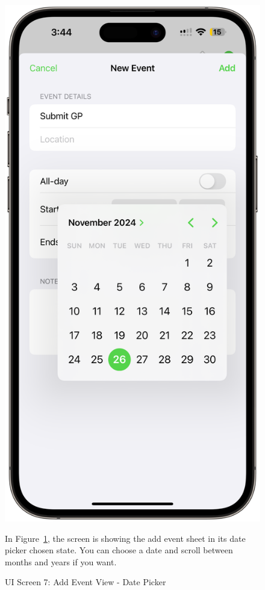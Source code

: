 \begin{figure}[!h]
    \begin{minipage}{0.3\textwidth}
        \centering
        \includegraphics[width=\textwidth]{images/screen7.png}
        \caption{UI Screen 7: Add Event View - Date Picker}
        \label{fig:ui-screen-7}
    \end{minipage}
    \hfill
    \begin{minipage}{0.65\textwidth}
        In Figure~\ref{fig:ui-screen-7}, the screen is showing the add event sheet in its date picker chosen state. You can choose a date and scroll between months and years if you want.
    \end{minipage}
\end{figure}

